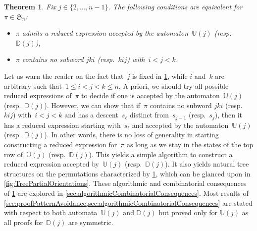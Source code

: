 \documentclass{amsart}
\newtheorem{theorem}{Theorem}%
\newcommand{\fS}{\mathfrak{S}} %
\newcommand{\automatonU}{\mathbb{U}} %
\newcommand{\automatonD}{\mathbb{D}} %
\begin{document}
\begin{theorem}\label{thm:patternAvoidance}
Fix $j \in \{2, \dots, n-1\}$.
The following conditions are equivalent for~$\pi \in \fS_n$:
\begin{itemize}
	\item $\pi$ admits a reduced expression accepted by the automaton~$\automatonU(j)$ (resp.~$\automatonD(j)$),
	\item $\pi$ contains no subword $jki$ (resp.~$kij$) with~$i < j < k$.
\end{itemize}
\end{theorem}

Let us warn the reader on the fact that~$j$ is fixed in \cref{thm:patternAvoidance}, while $i$ and~$k$ are arbitrary such that~$1 \le i < j < k \le n$.
A priori, we should try all possible reduced expressions of~$\pi$ to decide if one is accepted by the automaton~$\automatonU(j)$ (resp.~$\automatonD(j)$).
However, we can show that if~$\pi$ contains no subword $jki$ (resp.~$kij$) with~$i < j < k$ and has a descent~$s_\ell$ distinct from~$s_{j-1}$ (resp.~$s_j$), then it has a reduced expression starting with~$s_\ell$ and accepted by the automaton~$\automatonU(j)$ (resp.~$\automatonD(j)$).
In other words, there is no loss of generality in starting constructing a reduced expression for~$\pi$ as long as we stay in the states of the top row of~$\automatonU(j)$ (resp.~$\automatonD(j)$).
This yields a simple algorithm to construct a reduced expression accepted by~$\automatonU(j)$ (resp.~$\automatonD(j)$).
It also yields natural tree structures on the permutations characterized by \cref{thm:patternAvoidance}, which can be glanced upon in \cref{fig:TreePartialOrientations}.
These algorithmic and combinatorial consequences of \cref{thm:patternAvoidance} are explored in \cref{sec:algorithmicCombinatorialConsequences}.
Most results of \cref{sec:proofPatternAvoidance,sec:algorithmicCombinatorialConsequences} are stated with respect to both automata~$\automatonU(j)$ and $\automatonD(j)$ but proved only for $\automatonU(j)$ as all proofs for~$\automatonD(j)$ are symmetric.
\end{document}
